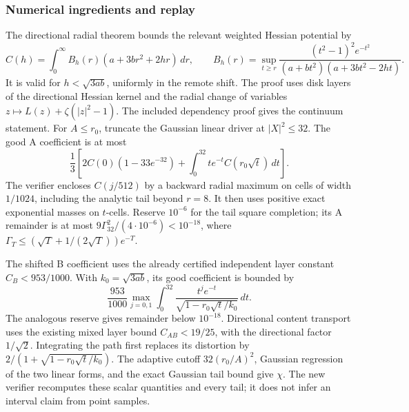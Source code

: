 \subsubsection{Numerical ingredients and replay}
The directional radial theorem bounds the relevant weighted Hessian
potential by
\[
 C(h)=\int_0^\infty B_h(r)(a+3br^2+2hr)\,dr,\qquad
 B_h(r)=\sup_{t\ge r}
 \frac{(t^2-1)^2e^{-t^2}}
 {(a+bt^2)(a+3bt^2-2ht)}.
\]
It is valid for \(h<\sqrt{3ab}\), uniformly in the remote shift.
The proof uses disk layers of the directional Hessian kernel and
the radial change of variables
\(z\mapsto L(z)+\zeta(|z|^2-1)\).
The included dependency proof gives the continuum statement.
For \(A\le r_0\), truncate the Gaussian linear driver at
\(|X|^2\le32\). The good A coefficient is at most
\[
 \frac13\left[
  2C(0)(1-33e^{-32})+\int_0^{32}t e^{-t}C(r_0\sqrt t)\,dt
 \right].
\]
The verifier encloses \(C(j/512)\) by a backward radial maximum on
cells of width \(1/1024\), including the analytic tail beyond \(r=8\).
It then uses positive exact exponential masses on \(t\)-cells.
Reserve \(10^{-6}\) for the tail square completion; its A remainder is
at most \(9\Gamma_{32}^2/(4\cdot10^{-6})<10^{-18}\), where
\(\Gamma_T\le(\sqrt T+1/(2\sqrt T))e^{-T}\).

The shifted B coefficient uses the already certified independent
layer constant \(C_B<953/1000\). With \(k_0=\sqrt{3ab}\), its good
coefficient is bounded by
\[
 \frac{953}{1000}\max_{j=0,1}
 \int_0^{32}\frac{t^j e^{-t}}{\sqrt{1-r_0\sqrt t/k_0}}\,dt.
\]
The analogous reserve gives remainder below \(10^{-18}\).
Directional content transport uses the existing mixed layer bound
\(C_{AB}<19/25\), with the directional factor \(1/\sqrt2\).
Integrating the path first replaces its distortion by
\(2/(1+\sqrt{1-r_0\sqrt t/k_0})\).
The adaptive cutoff \(32(r_0/A)^2\), Gaussian regression of the two
linear forms, and the exact Gaussian tail bound give \(\chi\).
The new verifier recomputes these scalar quantities and every tail;
it does not infer an interval claim from point samples.

